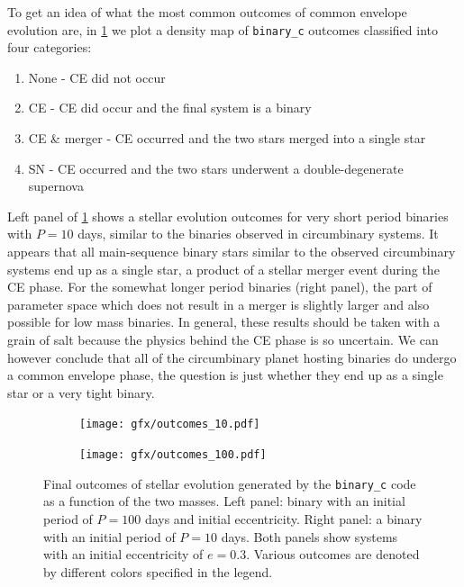 \documentclass[twoside,openright,titlepage,numbers=noenddot,headinclude,%
                footinclude=true,cleardoublepage=empty,abstractoff, 
                BCOR=5mm,paper=a4,fontsize=11pt,%
                american,%
                ]{scrreprt}%
\begin{document}
To get an idea of what the most common outcomes
of common envelope evolution are, in \cref{fig:evolution_outcomes} we plot a density 
map of \texttt{binary\_c} outcomes classified into four categories:
\begin{enumerate}
    \item None - CE did not occur
    \item CE - CE did occur and the final system is a binary
    \item CE \& merger - CE occurred and the two stars merged into a single star
    \item SN - CE occurred and the two stars underwent a double-degenerate supernova
\end{enumerate}
Left panel of \cref{fig:evolution_outcomes} shows a stellar evolution 
outcomes for very short period binaries with
$P=10$ days, similar to the binaries observed in circumbinary systems.  
It appears that all main-sequence
binary stars similar to the observed circumbinary systems end up as a single star, a 
product of a stellar merger event during the CE phase. 
For the somewhat longer period binaries (right panel), the part of parameter space
which does not result in a merger is slightly larger and also possible for low 
mass binaries. In general, these results should be taken with a grain of salt 
because the physics behind the CE phase is so uncertain. We can however conclude
that all of the circumbinary planet hosting binaries do undergo a common envelope
phase, the question is just whether they end up as a single star or a very tight 
binary.
\begin{figure}[t!]
\centering
\begin{subfigure}{0.52\textwidth}
  \centering
  \texttt{[image: gfx/outcomes\_10.pdf]}
\end{subfigure}%
\begin{subfigure}{0.52\textwidth}
  \centering
  \texttt{[image: gfx/outcomes\_100.pdf]}
\end{subfigure}
    \caption[Outcomes of binary stellar evolution.]{Final outcomes of 
    stellar evolution generated by the 
    \texttt{binary\_c} code as a function of the two masses. Left panel: 
    binary with an initial period of $P=100$ days and initial eccentricity. 
    Right panel: a 
    binary with an initial period of $P=10$ days. Both panels show systems 
    with an initial eccentricity of $e=0.3$. Various outcomes are denoted
    by different colors specified in the legend.}
\label{fig:evolution_outcomes}
\end{figure}
\end{document}
